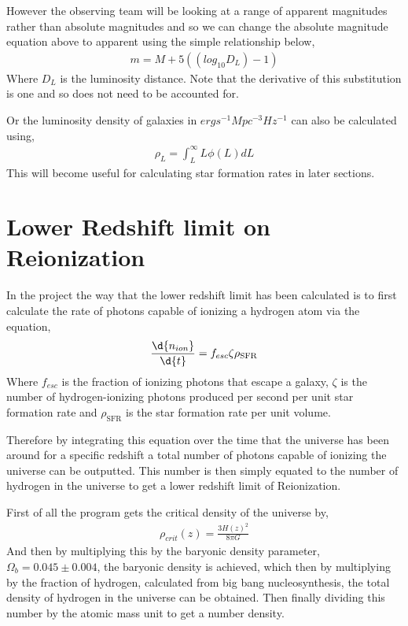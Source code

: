 	However the observing team will be looking at a range of apparent magnitudes rather than absolute magnitudes and so we can change the absolute magnitude equation above to apparent using the simple relationship below,
	\begin{align}
		m=M+5((log_{10}D_{L})-1)
	\end{align}
	Where $D_{L}$ is the luminosity distance. Note that the derivative of this substitution is one and so does not need to be accounted for.

	Or the luminosity density of galaxies in $erg s^{-1}Mpc^{-3}Hz^{-1}$ can also be calculated using,
	\begin{align}
		\rho_{L}=\int^{\infty}_{L}L\phi(L)dL
	\end{align}
	This will become useful for calculating star formation rates in later sections.

\section{Lower Redshift limit on Reionization} %
\label{sec:lower_redshift_limit_on_reionization}
	In the project the way that the lower redshift limit has been calculated is to first calculate the rate of photons capable of ionizing a hydrogen atom via the equation, \cite{2010Natur.468...49R}
	\begin{align}
		\frac{\d{n_{ion}}}{\d{t}}=f_{esc}\zeta\rho_\text{SFR}  
	\end{align}
	Where $f_{esc}$ is the fraction of ionizing photons that escape a galaxy, $\zeta$ is the number of hydrogen-ionizing photons produced per second per unit star formation rate and $\rho_\text{SFR}$ is the star formation rate per unit volume.
	
	Therefore by integrating this equation over the time that the universe has been around for a specific redshift a total number of photons capable of ionizing the universe can be outputted. This number is then simply equated to the number of hydrogen in the universe to get a lower redshift limit of Reionization.

	First of all the program gets the critical density of the universe by,
	\begin{align}
		\rho_{crit}(z)=\frac{3H(z)^{2}}{8\pi G}
	\end{align}
	And then by multiplying this by the baryonic density parameter, $\Omega_{b}=0.045\pm0.004$, the baryonic density is achieved, which then by multiplying by the fraction of hydrogen, calculated from big bang nucleosynthesis, the total density of hydrogen in the universe can be obtained. Then finally dividing this number by the atomic mass unit to get a number density.

